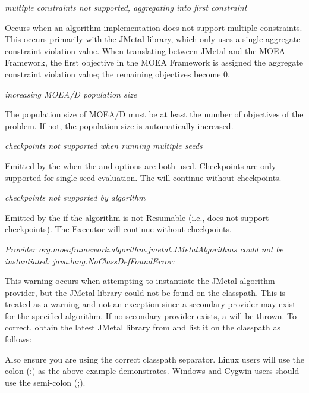 \noindent
\textit{multiple constraints not supported, aggregating into first constraint}
\begin{indented}
  Occurs when an algorithm implementation does not support multiple constraints. This occurs primarily with the JMetal library, which only uses a single aggregate constraint violation value.  When translating between JMetal and the MOEA Framework, the first objective in the MOEA Framework is assigned the aggregate constraint violation value; the remaining objectives become 0.
\end{indented}

\noindent
\textit{increasing MOEA/D population size}
\begin{indented}
  The population size of MOEA/D must be at least the number of objectives of the problem.  If not, the population size is automatically increased.
\end{indented}
  
\noindent
\textit{checkpoints not supported when running multiple seeds}
\begin{indented}
  Emitted by the  when the  and  options are both used.  Checkpoints are only supported for single-seed evaluation.  The  will continue without checkpoints.
\end{indented}
  
\noindent
\textit{checkpoints not supported by algorithm}
\begin{indented}
  Emitted by the  if the algorithm is not Resumable (i.e., does not support checkpoints).  The Executor will continue without checkpoints.
\end{indented}
  
\noindent
\textit{Provider org.moeaframework.algorithm.jmetal.JMetalAlgorithms could not be instantiated: java.lang.NoClassDefFoundError: }
\begin{indented}
  This warning occurs when attempting to instantiate the JMetal algorithm provider, but the JMetal library could not be found on the classpath.  This is treated as a warning and not an exception since a secondary provider may exist for the specified algorithm.  If no secondary provider exists, a  will be thrown.  To correct, obtain the latest JMetal library from  and list it on the  classpath as follows:
  \begin{indented}
  \end{indented}
  Also ensure you are using the correct classpath separator.  Linux users will use the colon (:) as the above example demonstrates.  Windows and Cygwin users should use the
  semi-colon (;).
\end{indented}
    
